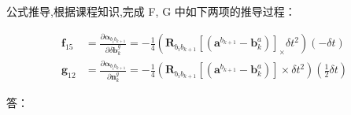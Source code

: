 \documentclass[12pt,a4paper,utf8]{article}
\begin{document}
公式推导,根据课程知识,完成 F, G 中如下两项的推导过程：

$$
\begin{aligned} 
\mathbf{f}_{15} &=
\frac{\partial \boldsymbol{\alpha}_{b_{i} b_{k+1}}}{\partial \delta \mathbf{b}_{k}^{g}} =
-\frac{1}{4}\left(\mathbf{R}_{b_{i} b_{k+1}}\left[\left(\mathbf{a}^{b_{k+1}}-\mathbf{b}_{k}^{a}\right)\right]_{ \times} \delta t^{2}\right)(-\delta t) \\ 
\mathbf{g}_{12} &=
\frac{\partial \boldsymbol{\alpha}_{b_{i} b_{k+1}}}{\partial \mathbf{n}_{k}^{g}} =
-\frac{1}{4}\left(\mathbf{R}_{b_{i} b_{k+1}}\left[\left(\mathbf{a}^{b_{k+1}}-\mathbf{b}_{k}^{a}\right)\right] \times \delta t^{2}\right)\left(\frac{1}{2} \delta t\right) 
\end{aligned}
$$

答：\newline
\end{document}
